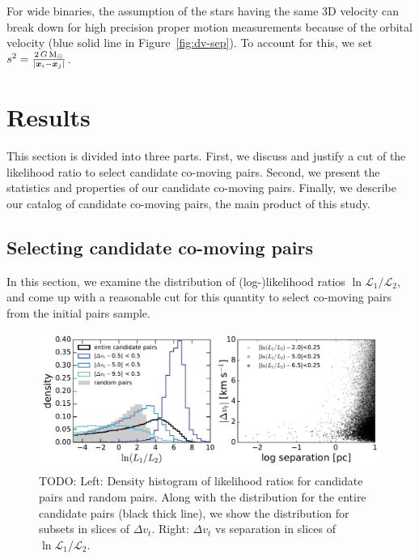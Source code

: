 \documentclass[manuscript, letterpaper]{aastex6}
\newcommand{\bs}[1]{\boldsymbol{#1}}
\renewcommand{\vec}[1]{\bs{#1}}
\newcommand{\msun}{{\rm M}_\odot}
\newcommand{\todo}[1]{{\color{red}TODO: #1}}
\begin{document}
For wide binaries, the assumption of the stars having the same 3D velocity can
break down for high precision proper motion measurements because of the orbital
velocity (blue solid line in Figure~\ref{fig:dv-sep}).
To account for this, we set $s^2 = \frac{2 \, G \, \msun}{|\vec{x}_i-\vec{x}_j|}$.

\section{Results} \label{sec:results}

This section is divided into three parts. First, we discuss and justify a cut of
the likelihood ratio to select candidate co-moving pairs.
Second, we present the statistics and properties of our candidate co-moving
pairs.
Finally, we describe our catalog of candidate co-moving pairs, the main product
of this study.

\subsection{Selecting candidate co-moving pairs}
\label{sub:selection}

In this section, we examine the distribution of (log-)likelihood ratios
$\ln \mathcal{L}_1 /\mathcal{L}_2$, and come up with a reasonable cut
for this quantity to select co-moving pairs from the initial pairs sample.

\begin{figure}[htbp]
  \begin{center}
    \includegraphics[width=\textwidth]{figures/likelihoodratios.pdf}
  \end{center}
  \caption{%
    \todo{
    Left: Density histogram of likelihood ratios for candidate pairs and random pairs.
    Along with the distribution for the entire candidate pairs (black thick line),
    we show the distribution for subsets in slices of $\Delta v_t$.
    Right: $\Delta v_t$ vs separation in slices of $\ln \mathcal{L}_1 /\mathcal{L}_2$.}
    \label{fig:likelihoodratios}}
    \vspace{1em}
\end{figure}
\end{document}
